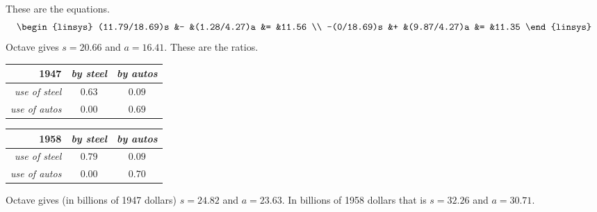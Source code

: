 \begin{ans}{3}
      \begin{exparts}
        \partsitem
          These are the equations.
	  \begin{equation*}
	    \begin{linsys}{2}
	       (11.79/18.69)s   &-   &(1.28/4.27)a &= &11.56 \\
	       -(0/18.69)s   &+   &(9.87/4.27)a &= &11.35
	    \end{linsys}
	  \end{equation*}
          Octave gives $s=20.66$ and $a=16.41$.
	\partsitem
          These are the ratios.
	  \begin{center}
            \begin{tabular}{r|cc}
               1947   &\textit{by steel}  &\textit{by autos}  \\ \hline
               \textit{use of steel}  &$0.63$ &$0.09$  \\
               \textit{use of autos}  &$0.00$ &$0.69$
            \end{tabular}
            \qquad
            \begin{tabular}{r|cc}
               1958   &\textit{by steel}  &\textit{by autos}  \\ \hline
               \textit{use of steel}  &$0.79$ &$0.09$  \\
               \textit{use of autos}  &$0.00$ &$0.70$
            \end{tabular}
          \end{center}
	\partsitem
          Octave gives (in billions of 1947 dollars) $s=24.82$ and $a=23.63$.
          In billions of 1958 dollars that is $s=32.26$ and $a=30.71$.
      \end{exparts}
    
\end{ans}
